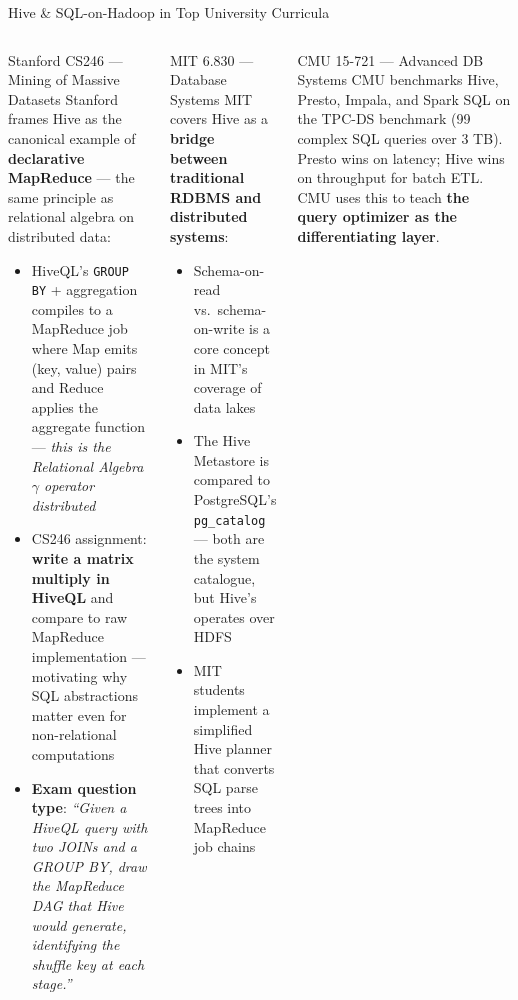 \documentclass[aspectratio=169,10pt]{beamer}
\begin{document}
\begin{frame}{Hive \& SQL-on-Hadoop in Top University Curricula}
  \begin{columns}[T]
      \begin{block}{Stanford CS246 — Mining of Massive Datasets}
        \small Stanford frames Hive as the canonical example of \textbf{declarative MapReduce} — the same principle as relational algebra on distributed data:
        \begin{itemize}
          \item HiveQL's \texttt{GROUP BY} + aggregation compiles to a MapReduce job where Map emits (key, value) pairs and Reduce applies the aggregate function — \textit{this is the Relational Algebra $\gamma$ operator distributed}
          \item CS246 assignment: \textbf{write a matrix multiply in HiveQL} and compare to raw MapReduce implementation — motivating why SQL abstractions matter even for non-relational computations
          \item \textbf{Exam question type}: \textit{``Given a HiveQL query with two JOINs and a GROUP BY, draw the MapReduce DAG that Hive would generate, identifying the shuffle key at each stage.''}
        \end{itemize}
      \end{block}

      \begin{exampleblock}{MIT 6.830 — Database Systems}
        \small MIT covers Hive as a \textbf{bridge between traditional RDBMS and distributed systems}:
        \begin{itemize}
          \item Schema-on-read vs.\ schema-on-write is a core concept in MIT's coverage of data lakes
          \item The Hive Metastore is compared to PostgreSQL's \texttt{pg\_catalog} — both are the system catalogue, but Hive's operates over HDFS
          \item MIT students implement a simplified Hive planner that converts SQL parse trees into MapReduce job chains
        \end{itemize}
      \end{exampleblock}
      \vspace{4pt}
      \begin{alertblock}{CMU 15-721 — Advanced DB Systems}
        \small CMU benchmarks Hive, Presto, Impala, and Spark SQL on the TPC-DS benchmark (99 complex SQL queries over 3 TB).  Presto wins on latency; Hive wins on throughput for batch ETL.  CMU uses this to teach \textbf{the query optimizer as the differentiating layer}.
      \end{alertblock}
  \end{columns}
\end{frame}
\end{document}
